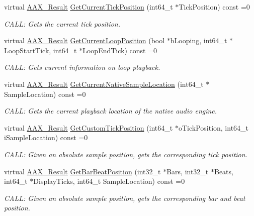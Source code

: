 \begin{DoxyCompactItemize}
virtual \mbox{\hyperlink{a00392_a4d8f69a697df7f70c3a8e9b8ee130d2f}{A\+A\+X\+\_\+\+Result}} \mbox{\hyperlink{a01885_a2d99dca311ddca98c4d455078edd42d5}{Get\+Current\+Tick\+Position}} (int64\+\_\+t $\ast$Tick\+Position) const =0
\begin{DoxyCompactList}\small\item\em C\+A\+LL\+: Gets the current tick position. \end{DoxyCompactList}\item 
virtual \mbox{\hyperlink{a00392_a4d8f69a697df7f70c3a8e9b8ee130d2f}{A\+A\+X\+\_\+\+Result}} \mbox{\hyperlink{a01885_a386bade7d8902130a02c6e6dc8b2123b}{Get\+Current\+Loop\+Position}} (bool $\ast$b\+Looping, int64\+\_\+t $\ast$Loop\+Start\+Tick, int64\+\_\+t $\ast$Loop\+End\+Tick) const =0
\begin{DoxyCompactList}\small\item\em C\+A\+LL\+: Gets current information on loop playback. \end{DoxyCompactList}\item 
virtual \mbox{\hyperlink{a00392_a4d8f69a697df7f70c3a8e9b8ee130d2f}{A\+A\+X\+\_\+\+Result}} \mbox{\hyperlink{a01885_a8119233b03774528ffaa519771d792a0}{Get\+Current\+Native\+Sample\+Location}} (int64\+\_\+t $\ast$Sample\+Location) const =0
\begin{DoxyCompactList}\small\item\em C\+A\+LL\+: Gets the current playback location of the native audio engine. \end{DoxyCompactList}\item 
virtual \mbox{\hyperlink{a00392_a4d8f69a697df7f70c3a8e9b8ee130d2f}{A\+A\+X\+\_\+\+Result}} \mbox{\hyperlink{a01885_a85aae48051f8596e8145268ecf173dcb}{Get\+Custom\+Tick\+Position}} (int64\+\_\+t $\ast$o\+Tick\+Position, int64\+\_\+t i\+Sample\+Location) const =0
\begin{DoxyCompactList}\small\item\em C\+A\+LL\+: Given an absolute sample position, gets the corresponding tick position. \end{DoxyCompactList}\item 
virtual \mbox{\hyperlink{a00392_a4d8f69a697df7f70c3a8e9b8ee130d2f}{A\+A\+X\+\_\+\+Result}} \mbox{\hyperlink{a01885_a51aebee28b9d285863c3527e936dd733}{Get\+Bar\+Beat\+Position}} (int32\+\_\+t $\ast$Bars, int32\+\_\+t $\ast$Beats, int64\+\_\+t $\ast$Display\+Ticks, int64\+\_\+t Sample\+Location) const =0
\begin{DoxyCompactList}\small\item\em C\+A\+LL\+: Given an absolute sample position, gets the corresponding bar and beat position. \end{DoxyCompactList}\item 

\end{DoxyCompactItemize}
